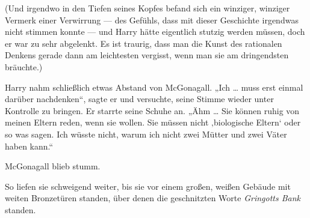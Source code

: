 (Und irgendwo in den Tiefen seines Kopfes befand sich ein winziger, winziger Vermerk einer Verwirrung — des Gefühls, dass mit dieser Geschichte irgendwas nicht stimmen konnte — und Harry hätte eigentlich stutzig werden müssen, doch er war zu sehr abgelenkt. Es ist traurig, dass man die Kunst des rationalen Denkens gerade dann am leichtesten vergisst, wenn man sie am dringendsten bräuchte.)

Harry nahm schließlich etwas Abstand von McGonagall.
„Ich … muss erst einmal darüber nachdenken“, sagte er und versuchte, seine Stimme wieder unter Kontrolle zu bringen. Er starrte seine Schuhe an. „Ähm … Sie können ruhig von meinen Eltern reden, wenn sie wollen. Sie müssen nicht ‚biologische Eltern‘ oder so was sagen. Ich wüsste nicht, warum ich nicht zwei Mütter und zwei Väter haben kann.“

McGonagall blieb stumm.

So liefen sie schweigend weiter, bis sie vor einem großen, weißen Gebäude mit weiten Bronzetüren standen, über denen die geschnitzten Worte \emph{Gringotts Bank} standen.

